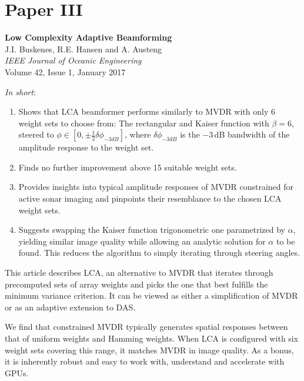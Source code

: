 \section{Paper III}\label{sec:paperIII} %
\textbf{Low Complexity Adaptive Beamforming}~\cite{Buskenes2016}\\
J.I. Buskenes, R.E. Hansen and A. Austeng\\
\textit{IEEE Journal of Oceanic Engineering}\\
Volume 42, Issue 1, January 2017

\textit{In short}:
\begin{enumerate}
\item Shows that LCA beamformer performs similarly to MVDR with only 6 weight sets to choose from: The rectangular and Kaiser function with $\beta=6$, steered to $\phi\in[0,\pm\frac{1}{2}\delta{\phi_{-3dB}}]$, where $\delta{\phi_{-3dB}}$ is the $-3$\,dB bandwidth of the amplitude response to the weight set.
\item Finds no further improvement above 15 suitable weight sets.
\item Provides insights into typical amplitude responses of MVDR constrained for active sonar imaging and pinpoints their resemblance to the chosen LCA weight sets. 
\item Suggests swapping the Kaiser function trigonometric one parametrized by $\alpha$, yielding similar image quality while allowing an analytic solution for $\alpha$ to be found. This reduces the algorithm to simply iterating through steering angles.
\end{enumerate}

This article describes LCA, an alternative to MVDR that iterates through precomputed sets of array weights and picks the one that best fulfills the minimum variance criterion. It can be viewed as either a simplification of MVDR or as an adaptive extension to DAS.

We find that constrained MVDR typically generates spatial responses between that of uniform weights and Hamming weights. When LCA is configured with six weight sets covering this range, it matches MVDR in image quality. As a bonus, it is inherently robust and easy to work with, understand and accelerate with GPUs.


